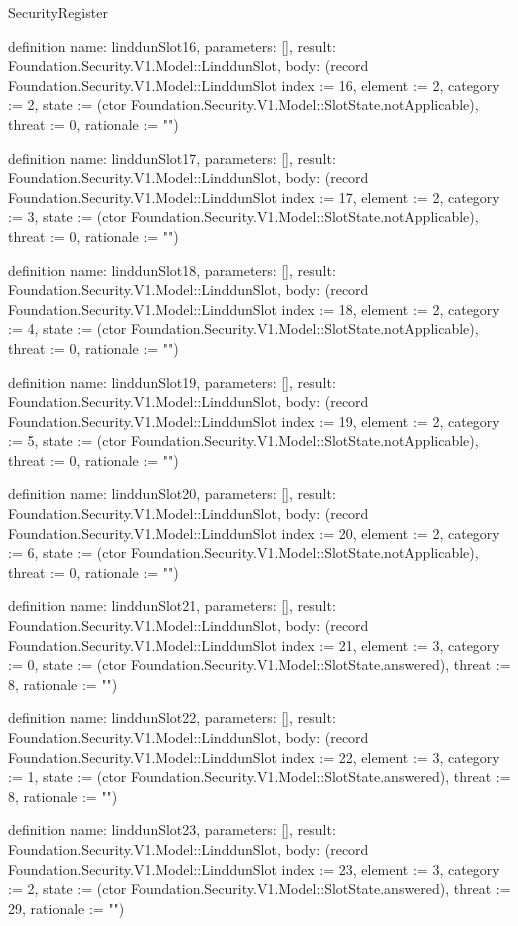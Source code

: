 \begin{lexlean}{SecurityRegister}
\begin{semanticmodule}
definition{
  name: linddunSlot16,
  parameters: [],
  result: Foundation.Security.V1.Model::LinddunSlot,
  body: (record Foundation.Security.V1.Model::LinddunSlot {index := 16, element := 2, category := 2, state := (ctor Foundation.Security.V1.Model::SlotState.notApplicable), threat := 0, rationale := ""})
}

definition{
  name: linddunSlot17,
  parameters: [],
  result: Foundation.Security.V1.Model::LinddunSlot,
  body: (record Foundation.Security.V1.Model::LinddunSlot {index := 17, element := 2, category := 3, state := (ctor Foundation.Security.V1.Model::SlotState.notApplicable), threat := 0, rationale := ""})
}

definition{
  name: linddunSlot18,
  parameters: [],
  result: Foundation.Security.V1.Model::LinddunSlot,
  body: (record Foundation.Security.V1.Model::LinddunSlot {index := 18, element := 2, category := 4, state := (ctor Foundation.Security.V1.Model::SlotState.notApplicable), threat := 0, rationale := ""})
}

definition{
  name: linddunSlot19,
  parameters: [],
  result: Foundation.Security.V1.Model::LinddunSlot,
  body: (record Foundation.Security.V1.Model::LinddunSlot {index := 19, element := 2, category := 5, state := (ctor Foundation.Security.V1.Model::SlotState.notApplicable), threat := 0, rationale := ""})
}

definition{
  name: linddunSlot20,
  parameters: [],
  result: Foundation.Security.V1.Model::LinddunSlot,
  body: (record Foundation.Security.V1.Model::LinddunSlot {index := 20, element := 2, category := 6, state := (ctor Foundation.Security.V1.Model::SlotState.notApplicable), threat := 0, rationale := ""})
}

definition{
  name: linddunSlot21,
  parameters: [],
  result: Foundation.Security.V1.Model::LinddunSlot,
  body: (record Foundation.Security.V1.Model::LinddunSlot {index := 21, element := 3, category := 0, state := (ctor Foundation.Security.V1.Model::SlotState.answered), threat := 8, rationale := ""})
}

definition{
  name: linddunSlot22,
  parameters: [],
  result: Foundation.Security.V1.Model::LinddunSlot,
  body: (record Foundation.Security.V1.Model::LinddunSlot {index := 22, element := 3, category := 1, state := (ctor Foundation.Security.V1.Model::SlotState.answered), threat := 8, rationale := ""})
}

definition{
  name: linddunSlot23,
  parameters: [],
  result: Foundation.Security.V1.Model::LinddunSlot,
  body: (record Foundation.Security.V1.Model::LinddunSlot {index := 23, element := 3, category := 2, state := (ctor Foundation.Security.V1.Model::SlotState.answered), threat := 29, rationale := ""})
}


\end{semanticmodule}
\end{lexlean}
